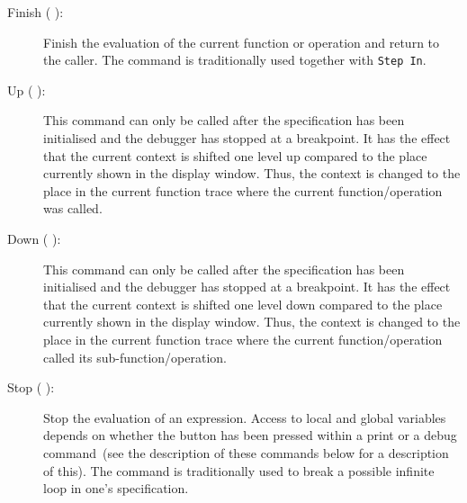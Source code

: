 \documentclass[\pformat,12pt]{article}
\newcommand{\guicmd}[1]{{\sf #1}}
\begin{document}
\begin{description}
\item[\guicmd{Finish} (\hspace{-1.8mm}
):] 
Finish the evaluation of the current function
  or operation and return to the caller. The command is traditionally
  used together with {\tt Step In}.
  
\item[\guicmd{Up} (\hspace{-1.8mm}
):] 
This command can only be called after the
specification has been initialised and the debugger has stopped at a
breakpoint. It has the effect that the current context is shifted one
level up compared to the place currently shown in the display
window. Thus, the context is changed to the place in the current
function trace where the current function/operation was called.

\item[\guicmd{Down} (\hspace{-1.8mm}
):]
This command can only be called after the specification has been
initialised and the debugger has stopped at a breakpoint. It has the
effect that the current context is shifted one level down compared to
the place currently shown in the display window. Thus, the context is
changed to the place in the current function trace where the current
function/operation called its sub-function/operation.

\item[\guicmd{Stop} (\hspace{-1.8mm}
):] 
Stop the evaluation of an
  expression. Access to local and global variables depends on whether
  the button has been pressed within a \guicmd{print} or a
  \guicmd{debug} command~(see the description of these commands below
  for a description of this). The command is traditionally
  used to break a possible infinite loop in one's specification.

\end{description}
\end{document}
